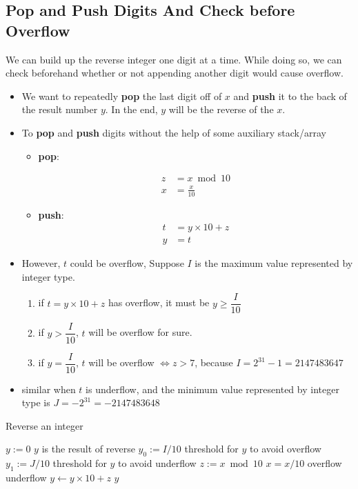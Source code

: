 \subsection{Pop and Push Digits And Check before Overflow}
We can build up the reverse integer one digit at a time. While doing so, we can check beforehand whether or not appending another digit would cause overflow.
\begin{itemize}
	\item We want to repeatedly \textbf{pop} the last digit off of $x$ and \textbf{push} it to the back of the result number $y$. In the end, $y$ will be the reverse of the $x$.
	\item To \textbf{pop} and \textbf{push} digits without the help of some auxiliary stack/array
	\begin{itemize}
		\item \textbf{pop}: 
		
		\begin{align*}
			z &= x \bmod 10 \\
			x &= \frac{x}{10}
		\end{align*}
		
		\item \textbf{push}:
		\begin{align*}
			t &= y \times 10 + z \\
			y &= t
		\end{align*}
	\end{itemize}
	\item However, $t$ could be overflow, Suppose $I$ is the maximum value represented by integer type.
	\begin{enumerate}
		\item if $t = y \times 10 + z$ has overflow, it must be $y \geq \dfrac{I}{10}$
		\item if $y > \dfrac{I}{10} $, $t$ will be overflow for sure.
		\item if $y = \dfrac{I}{10}$, $t$ will be overflow $\iff z > 7$, because $I = 2^{31} - 1 = 2147483647$
	\end{enumerate}
	\item similar when $t$ is underflow, and the minimum value represented by integer type is $J = -2^{31} = -2147483648$
\end{itemize}

\setcounter{algorithm}{0}
\begin{algorithm}[H]
	\caption{Reverse an integer}
	\begin{algorithmic}[1]
		\State $y:=0$ \Comment $y$ is the result of reverse
		\State $y_0:= I/10$ \Comment threshold for $y$ to avoid overflow
		\State $y_1:= J/10$ \Comment threshold for $y$ to avoid underflow
		\State $z := x \bmod 10$
		\State $x = x/10$
		 \Comment overflow
		\State {}
		 \Comment underflow
		\State {}
		\Else
		\State $y\gets y\times 10 + z$
		\EndIf
		\EndWhile
		\State \Return $y$
		\EndProcedure
	\end{algorithmic}
\end{algorithm}
